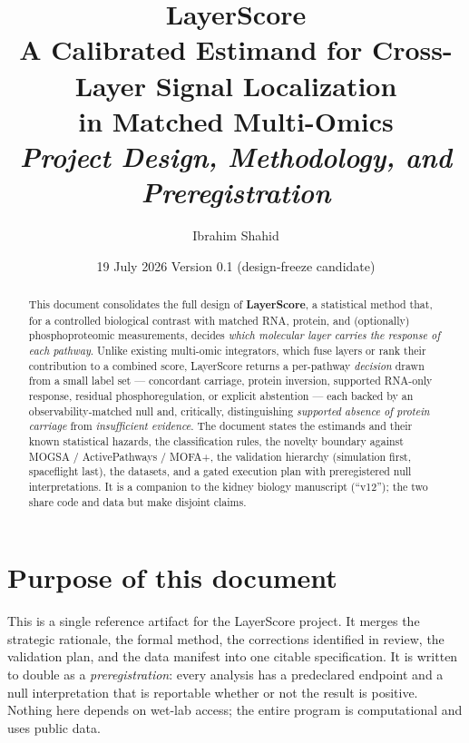 \documentclass[11pt]{article}
\title{\vspace{-1.2cm}\textbf{LayerScore}\\[2pt]
\large A Calibrated Estimand for Cross-Layer Signal Localization\\ in Matched Multi-Omics\\[6pt]
\normalsize\textit{Project Design, Methodology, and Preregistration}}
\author{Ibrahim Shahid}
\date{19 July 2026 \quad\textbar\quad Version 0.1 (design-freeze candidate)}
\begin{document}
\maketitle
\vspace{-0.6cm}

\begin{abstract}
\noindent This document consolidates the full design of \textbf{LayerScore}, a statistical method that,
for a controlled biological contrast with matched RNA, protein, and (optionally) phosphoproteomic
measurements, decides \emph{which molecular layer carries the response of each pathway}. Unlike existing
multi-omic integrators, which fuse layers or rank their contribution to a combined score, LayerScore
returns a per-pathway \emph{decision} drawn from a small label set --- concordant carriage, protein
inversion, supported RNA-only response, residual phosphoregulation, or explicit abstention --- each backed
by an observability-matched null and, critically, distinguishing \emph{supported absence of protein
carriage} from \emph{insufficient evidence}. The document states the estimands and their known statistical
hazards, the classification rules, the novelty boundary against MOGSA / ActivePathways / MOFA+, the
validation hierarchy (simulation first, spaceflight last), the datasets, and a gated execution plan with
preregistered null interpretations. It is a companion to the kidney biology manuscript (``v12''); the two
share code and data but make disjoint claims.
\end{abstract}

\tableofcontents
\vspace{0.4cm}

\section{Purpose of this document}
This is a single reference artifact for the LayerScore project. It merges the strategic rationale, the
formal method, the corrections identified in review, the validation plan, and the data manifest into one
citable specification. It is written to double as a \emph{preregistration}: every analysis has a
predeclared endpoint and a null interpretation that is reportable whether or not the result is positive.
Nothing here depends on wet-lab access; the entire program is computational and uses public data.

\end{document}
